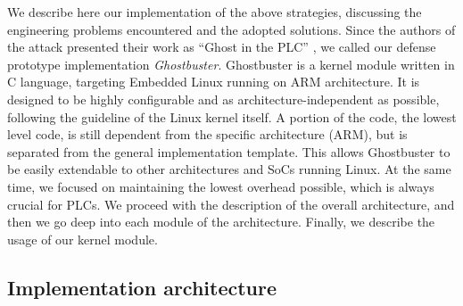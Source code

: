 We describe here our implementation of the above strategies, discussing the engineering problems encountered and the adopted solutions.
Since the authors of the attack presented their work as ``Ghost in the PLC'' \cite{ghostplc}, we called our defense prototype implementation \emph{Ghostbuster}.
Ghostbuster is a kernel module written in C language, targeting Embedded Linux running on ARM architecture.
It is designed to be highly configurable and as architecture-independent as possible, following the guideline of the Linux kernel itself.
A portion of the code, \ie the lowest level code, is still dependent from the specific architecture (\eg ARM), but is separated from the general implementation template.
This allows Ghostbuster to be easily extendable to other architectures and SoCs running Linux. At the same time, we focused on maintaining the lowest overhead possible,
which is always crucial for PLCs. We proceed with the description of the overall architecture, and then we go deep into each module of the architecture.
Finally, we describe the usage of our kernel module.


\subsection{Implementation architecture}

